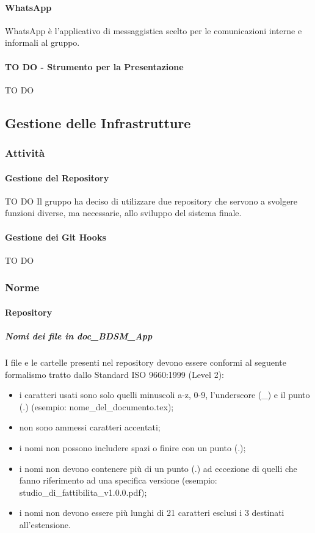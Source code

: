 			\paragraph{WhatsApp}
			WhatsApp è l'applicativo di messaggistica scelto per le comunicazioni interne e informali al gruppo.
			\paragraph{TO DO - Strumento per la Presentazione}
			TO DO


	\subsection{Gestione delle Infrastrutture}
		\subsubsection{Attività}
			\paragraph{Gestione del Repository}
			TO DO
			Il gruppo ha deciso di utilizzare due repository che servono a svolgere funzioni diverse, ma necessarie, allo sviluppo del sistema finale.
			
			\paragraph{Gestione dei Git Hooks}
			TO DO
		\subsubsection{Norme}
			\paragraph{Repository}
				\subparagraph{Nomi dei file in doc\_BDSM\_App}
				I file e le cartelle presenti nel repository devono essere conformi al seguente formalismo tratto dallo Standard ISO 9660:1999 (Level 2):
					\begin{itemize}
						\item i caratteri usati sono solo quelli minuscoli a-z, 0-9, l'underscore (\_) e il punto (.) (esempio: nome\_del\_documento.tex);
						\item non sono ammessi caratteri accentati;
						\item i nomi non possono includere spazi o finire con un punto (.);
						\item i nomi non devono contenere più di un punto (.) ad eccezione di quelli che fanno riferimento ad una specifica versione (esempio: studio\_di\_fattibilita\_v1.0.0.pdf);
						\item i nomi non devono essere più lunghi di 21 caratteri esclusi i 3 destinati all'estensione.
					\end{itemize}

